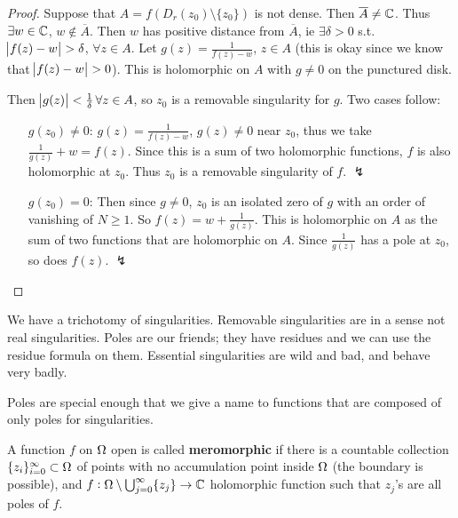 \begin{proof}
Suppose that $A = f(D_r(z_0) \setminus \{ z_0 \})$ is not dense. Then $\overline{A} \neq \mathbb{C}$. Thus $\exists w \in \mathbb{C}$, $w \notin \overline{A} $. Then  $w$ has positive distance from $\overline{A}$, ie $\exists \delta >0$ s.t. $\abs{f(z) - w} > \delta$, $\forall z \in A$. Let $g(z) = \frac{1}{f(z) - w}$, $z \in A$ (this is okay since we know that $\abs{f(z) - w} > 0$). This is holomorphic on $A$ with $g \neq 0$ on the punctured disk.

Then $\abs{g(z)} < \frac{1}{\delta} \, \forall z \in A$, so $z_0$ is a removable singularity for $g$. Two cases follow:


\begin{enumerate}
    \item[$g(z_0) \neq 0$:] $g(z) = \frac{1}{f(z) - w}$, $g(z) \neq 0$ near $z_0$, thus we take $\frac{1}{g(z)} + w = f(z)$. Since this is a sum of two holomorphic functions, $f$ is also holomorphic at $z_0$. Thus $z_0$ is a removable singularity of $f$. $\lightning$
    \item[$g(z_0) = 0$:] Then since $g\neq 0$,  $z_0$ is an isolated zero of $g$ with an order of vanishing of $N \geq 1$. So $f(z) = w + \frac{1}{g(z)}$. This is holomorphic on $A$ as the sum of two functions that are holomorphic on $A$. Since $\frac{1}{g(z)}$ has a pole at $z_0$, so does $f(z)$. $\lightning$
\end{enumerate}





\end{proof}



\begin{remark}
We have a trichotomy of singularities. Removable singularities are in a sense not real singularities. Poles are our friends; they have residues and we can use the residue formula on them. Essential singularities are wild and bad, and behave very badly.
\end{remark}

Poles are special enough that we give a name to functions that are composed of only poles for singularities.


\begin{definition}
A function $f$ on $\Omega$ open is called \textbf{meromorphic} if there is a countable collection $\{ z_i \}_{i=0}^\infty \subset \Omega$ of points with no accumulation point inside $\Omega$ (the boundary is possible), and $f: \Omega \setminus \bigcup_{j=0}^\infty \{ z_j \} \to \mathbb{C} $ holomorphic function such that $z_j$'s are all poles of $f$.
\end{definition}



